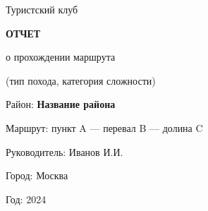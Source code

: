 \begin{titlepage}

\begin{center}

{\large Туристский клуб}

\vspace{2cm}

{\LARGE \textbf{ОТЧЕТ}}

\vspace{0.5cm}

{\Large о прохождении маршрута}

\vspace{1cm}

{\Large (тип похода, категория сложности)}

\vspace{2cm}

Район: \textbf{Название района}

\vspace{1cm}

Маршрут:  
пункт A --- перевал B --- долина C

\vfill

Руководитель: Иванов И.И.  

Город: Москва  

Год: 2024

\end{center}

\end{titlepage}